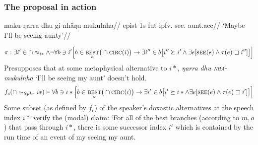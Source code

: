 	\iffalse
		The entries i had in the FoDS talk (definitely don't get it right):
		
		
		\gls{II} as modal-for-the-present
		
		
		$$\llbracket \gls{II}(\varphi)\rrbracket^{w,t*,\textbf{\textsc{mb}}}\leftrightarrow\forall w^\prime\in \textsc{\textbf{mb}}(w,t*)[t*\preceq t^\prime\wedge\varphi(w^\prime,t^\prime)] $$
		\textit{$ \varphi $ holds at or after speech time in all worlds that are \textbf{mb-}accessible from $ w $}
		
		\gls{IV} as modal-for-the-past
		
		
		$$\llbracket\gls{IV}(\varphi)\rrbracket^{w,t*,\textbf{\textsc{mb}}}\leftrightarrow\forall w^\prime\in \textsc{\textbf{mb}}(w,t*)[t*\succ t^\prime\wedge\varphi(w^\prime,t^\prime)] $$
		\textit{$ \varphi $ holds before speech time in all worlds that are \textbf{mb-}accessible from $ w $}
	\fi

\subsubsection{The proposal in action}

\pex\begingl\gla maku ŋarra dhu gi nhäŋu mukulnha//
\glb \gls{epist} 1s \gls{fut} \gls{ipfv}.\II{} see.\II{} aunt.\gls{acc}//
\glft `Maybe I'll be seeing aunty'//\endgl\


{\small$$ \pi:\exists i'\in\cap\approx_{i*}\wedge\neg\forall b\ni i'\Big[b\in\underset{o}{\textsc{best}}\big(\cap\textsc{circ}(i)\big)\to\exists i''\in b\big[i''\succeq i'\wedge\exists e[\textsc{see}(e)\wedge\tau(e)\sqsupset i'']\big]\Big] $$}
Presupposes that at some metaphysical alternative to $ i* $, \textit{ŋarra dhu \textsc{nhä-} mukulnha} `I'll be seeing my aunt' doesn't hold.
$$ f_c(\cap\sim_{Spkr}i*)\vDash\forall b\ni i*\Big[b\in\underset{o}{\textsc{best}}\big(\cap\textsc{circ}(i)\big)\to\exists i'\in b\big[i'\succeq i*\wedge\exists e[\textsc{see}(e)\wedge\tau(e)\sqsupset i']\big]\Big] $$
Some subset (as defined by $ f_c $) of the speaker's doxastic alternatives at the speech index $ i* $ verify the (modal) claim: `For all of the best branches (according to $ m,o $) that pass through $ i* $, there is some successor index $ i' $ which is contained by the run time of an event of my seeing my aunt.

